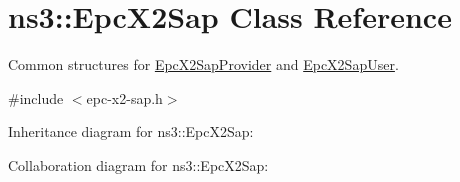 \hypertarget{classns3_1_1EpcX2Sap}{}\section{ns3\+:\+:Epc\+X2\+Sap Class Reference}
\label{classns3_1_1EpcX2Sap}


Common structures for \hyperlink{classns3_1_1EpcX2SapProvider}{Epc\+X2\+Sap\+Provider} and \hyperlink{classns3_1_1EpcX2SapUser}{Epc\+X2\+Sap\+User}.  




{\ttfamily \#include $<$epc-\/x2-\/sap.\+h$>$}



Inheritance diagram for ns3\+:\+:Epc\+X2\+Sap\+:


Collaboration diagram for ns3\+:\+:Epc\+X2\+Sap\+:
